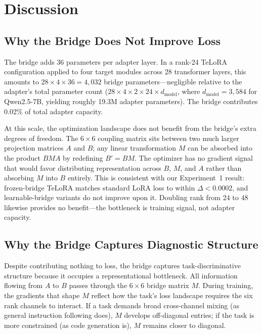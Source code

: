 \section{Discussion}
\label{sec:discussion}

\subsection{Why the Bridge Does Not Improve Loss}

The bridge adds 36 parameters per adapter layer. In a rank-24
TeLoRA configuration applied to four target modules across 28
transformer layers, this amounts to $28 \times 4 \times 36 = 4{,}032$
bridge parameters---negligible relative to the adapter's total
parameter count ($28 \times 4 \times 2 \times 24 \times d_{\text{model}}$,
where $d_{\text{model}} = 3{,}584$ for Qwen2.5-7B, yielding roughly
19.3M adapter parameters). The bridge contributes 0.02\% of total
adapter capacity.

At this scale, the optimization landscape does not benefit from the
bridge's extra degrees of freedom. The $6 \times 6$ coupling matrix
sits between two much larger projection matrices $A$ and $B$; any
linear transformation $M$ can be absorbed into the product $BMA$ by
redefining $B' = BM$. The optimizer has no gradient signal that would
favor distributing representation across $B$, $M$, and $A$ rather
than absorbing $M$ into $B$ entirely. This is consistent with our
Experiment~1 result: frozen-bridge TeLoRA matches standard LoRA
loss to within $\Delta < 0.0002$, and learnable-bridge variants do
not improve upon it. Doubling rank from 24 to 48 likewise provides
no benefit---the bottleneck is training signal, not adapter capacity.

\subsection{Why the Bridge Captures Diagnostic Structure}

Despite contributing nothing to loss, the bridge captures
task-discriminative structure because it occupies a representational
bottleneck. All information flowing from $A$ to $B$ passes through
the $6 \times 6$ bridge matrix $M$. During training, the gradients
that shape $M$ reflect how the task's loss landscape requires the
six rank channels to interact. If a task demands broad cross-channel
mixing (as general instruction following does), $M$ develops
off-diagonal entries; if the task is more constrained (as code
generation is), $M$ remains closer to diagonal.

